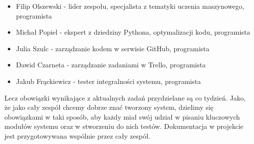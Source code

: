 \documentclass{article}
\begin{document}
\begin{itemize}
\item Filip Olszewski - lider zespołu, specjalista z tematyki uczenia maszynowego, programista
\item Michał Popiel - ekspert z dziedziny Pythona, optymalizacji kodu, programista
\item Julia Szulc - zarządzanie kodem w serwisie GitHub, programista
\item Dawid Czarneta - zarządzanie zadaniami w Trello, programista
\item Jakub Frąckiewicz - tester integralności systemu, programista
\end{itemize}
Lecz obowiązki wynikające z aktualnych zadań przydzielane są co tydzień. Jako, że jako cały zespół chcemy dobrze znać tworzony system, dzielimy się obowiązkami w taki sposób, aby każdy miał swój udział w pisaniu kluczowych modułów systemu oraz w stworzeniu do nich testów.
Dokumentacja w projekcie jest przygotowywana wspólnie przez cały zespół.
\end{document}
